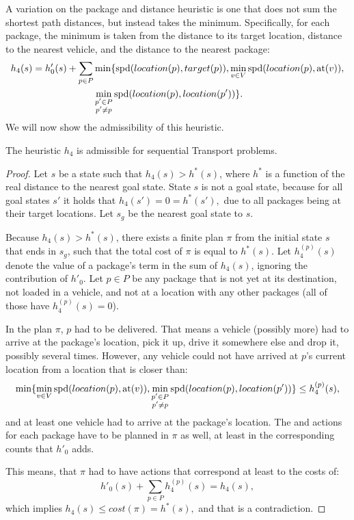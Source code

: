 A variation on the package and distance heuristic
is one that does not sum the shortest path distances, but instead takes
the minimum.
Specifically, for each package, the minimum
is taken from the distance to its target location,
distance to the nearest vehicle,
and the distance to the nearest package:
\begin{align*}
h_4(s) = h'_0(s) + \sum_{p \in P} &\min\lbrace
\textrm{spd}(location(p), target(p)),
\min_{v \in V} \textrm{spd}(location(p), \textrm{at}(v)),\\
&\min_{\substack{p' \in P\\p' \neq p}} \textrm{spd}(location(p), location(p'))\rbrace.
\end{align*}
We will now show the admissibility of this heuristic.
\begin{thm}
The heuristic $h_4$ is admissible for sequential Transport problems.
\end{thm}
\begin{proof}
Let $s$ be a state such that $h_4(s) > h^*(s)$,
where $h^*$ is a function of the real distance to the nearest goal state.
State $s$ is not a goal state, because for all goal states $s'$
it holds that
$h_4(s') = 0 = h^*(s'),$ due to all packages being at their target locations.
Let $s_g$ be the nearest goal state to $s$.

Because $h_4(s) > h^*(s)$, there exists a finite plan $\pi$ from the initial state $s$ that ends in $s_g$,
such that the total cost of $\pi$ is equal to $h^*(s)$.
Let $h^{(p)}_4(s)$ denote the value of a package's term in the sum of $h_4(s)$,
ignoring the contribution of $h'_0$.
Let $p \in P$ be any package that is not yet at its destination,
not loaded in a vehicle, and not at a location with any other packages
(all of those have $h^{(p)}_4(s) = 0$).

In the plan $\pi$, $p$ had to be delivered.
That means a vehicle (possibly more)
had to arrive at the
package's location, pick it up, drive it somewhere else and drop it,
possibly several times.
However, any vehicle could not have arrived at $p$'s current location from a location that is closer than: $$\min\{\min_{v \in V} \textrm{spd}(location(p), \textrm{at}(v)),
\min_{\substack{p' \in P\\p' \neq p}} \textrm{spd}(location(p), location(p'))\} \leq h^{(p)}_4(s),$$
and at least one vehicle had to arrive at the package's location.
The \pickup{} and \drop{} actions for each package have to be planned in $\pi$ as well, at least in the corresponding counts that $h'_0$ adds.

This means, that $\pi$ had to have actions that correspond at least to the costs of:
$$h'_0(s) + \sum_{p \in P} h_4^{(p)}(s) = h_4(s),$$
which implies $h_4(s) \leq cost(\pi) = h^*(s),$ and that is a contradiction.
\end{proof}

